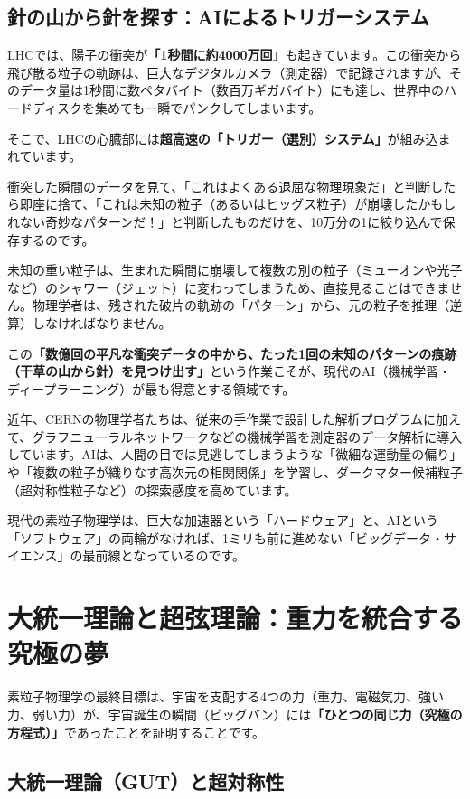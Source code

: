 \subsection{針の山から針を探す：AIによるトリガーシステム}

LHCでは、陽子の衝突が\textbf{「1秒間に約4000万回」}も起きています。この衝突から飛び散る粒子の軌跡は、巨大なデジタルカメラ（測定器）で記録されますが、そのデータ量は1秒間に数ペタバイト（数百万ギガバイト）にも達し、世界中のハードディスクを集めても一瞬でパンクしてしまいます。

そこで、LHCの心臓部には\textbf{超高速の「トリガー（選別）システム」}が組み込まれています。

衝突した瞬間のデータを見て、「これはよくある退屈な物理現象だ」と判断したら即座に捨て、「これは未知の粒子（あるいはヒッグス粒子）が崩壊したかもしれない奇妙なパターンだ！」と判断したものだけを、10万分の1に絞り込んで保存するのです。

未知の重い粒子は、生まれた瞬間に崩壊して複数の別の粒子（ミューオンや光子など）のシャワー（ジェット）に変わってしまうため、直接見ることはできません。物理学者は、残された破片の軌跡の「パターン」から、元の粒子を推理（逆算）しなければなりません。

この\textbf{「数億回の平凡な衝突データの中から、たった1回の未知のパターンの痕跡（干草の山から針）を見つけ出す」}という作業こそが、現代のAI（機械学習・ディープラーニング）が最も得意とする領域です。

近年、CERNの物理学者たちは、従来の手作業で設計した解析プログラムに加えて、グラフニューラルネットワークなどの機械学習を測定器のデータ解析に導入しています。AIは、人間の目では見逃してしまうような「微細な運動量の偏り」や「複数の粒子が織りなす高次元の相関関係」を学習し、ダークマター候補粒子（超対称性粒子など）の探索感度を高めています。

現代の素粒子物理学は、巨大な加速器という「ハードウェア」と、AIという「ソフトウェア」の両輪がなければ、1ミリも前に進めない「ビッグデータ・サイエンス」の最前線となっているのです。

\section{大統一理論と超弦理論：重力を統合する究極の夢}

素粒子物理学の最終目標は、宇宙を支配する4つの力（重力、電磁気力、強い力、弱い力）が、宇宙誕生の瞬間（ビッグバン）には\textbf{「ひとつの同じ力（究極の方程式）」}であったことを証明することです。

\subsection{大統一理論（GUT）と超対称性}

